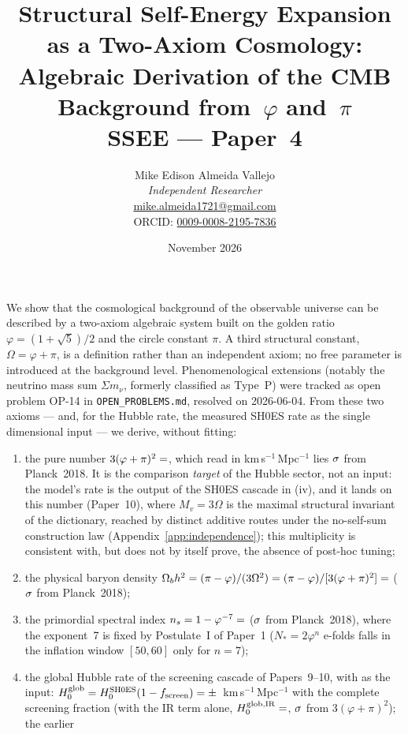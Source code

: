 \documentclass[12pt,a4paper]{article}
\title{\textbf{Structural Self-Energy Expansion as a Two-Axiom Cosmology:\\
Algebraic Derivation of the CMB Background from~$\varphi$ and~$\pi$}\\[0.5em]
\normalsize SSEE — Paper~4}
\author{Mike Edison Almeida Vallejo \\
\small \textit{Independent Researcher} \\
\small \href{mailto:mike.almeida1721@gmail.com}{mike.almeida1721@gmail.com} \\
\small ORCID: \href{https://orcid.org/0009-0008-2195-7836}{0009-0008-2195-7836}
}
\date{November 2026}
\renewenvironment{abstract}
  {\begin{center}\textbf{\abstractname}\end{center}\par\small\noindent\ignorespaces}
  {\par\medskip}
\begin{document}
\maketitle

\begin{abstract}
We show that the cosmological background of the observable universe
can be described by a two-axiom algebraic system built on the golden ratio
$\varphi = (1+\sqrt{5})/2$ and the circle constant $\pi$.
A third structural constant, $\Omega = \varphi+\pi$, is a definition
rather than an independent axiom; no free parameter is introduced at the background level.
Phenomenological extensions (notably the neutrino mass sum $\Sigma m_\nu$, formerly classified as Type~P) were tracked as open problem OP-14 in \texttt{OPEN\_PROBLEMS.md}, resolved on 2026-06-04.
From these two axioms --- and, for the Hubble rate, the measured SH0ES rate as the single
dimensional input --- we derive, without fitting:
\begin{enumerate}
\item[(i)] the pure number $3(\varphi+\pi)^2 = \val{H0_ALG_d6}$, which read in km\,s$^{-1}$\,Mpc$^{-1}$ lies $\val{halg_planck_sig}\sigma$ from Planck~2018. It is the comparison \emph{target} of the Hubble sector, not an input: the model's rate is the output of the SH0ES cascade in (iv), and it lands on this number (Paper~10),
where $M_v=3\Omega$ is the maximal structural invariant of the dictionary, reached by  distinct additive routes under the no-self-sum construction law (Appendix~\ref{app:independence}); this multiplicity is consistent with, but does not by itself prove, the absence of post-hoc tuning;
\item[(ii)] the physical baryon density
$\Omega_b h^2 = (\pi-\varphi)/(3\Omega^2) = (\pi-\varphi)/[3(\varphi+\pi)^2] = \val{OMEGA_B_H2_d6}$ ($\val{wb_planck_sig}\sigma$ from Planck~2018);
\item[(iii)] the primordial spectral index
$n_s = 1-\varphi^{-7} = \val{N_S_d6}$ ($\val{ns_planck_sig}\sigma$ from Planck~2018),
where the exponent~7 is fixed by Postulate~I of Paper~1 ($N_*=2\varphi^n$ e-folds falls in the
inflation window $[50,60]$ only for $n=7$);
\item[(iv)] the global Hubble rate of the screening cascade of Papers~9--10, with
\citet{Riess2022} as the input: $H_0^{\rm glob}=H_0^{\rm SH0ES}(1-f_{\rm screen})=\val{H0_GLOBAL_d6}\pm\val{p9_hglob_sigma}$~km\,s$^{-1}$\,Mpc$^{-1}$
with the complete screening fraction (with the IR term alone,
$H_0^{\rm glob,IR}=\val{p9_sh0es_glob_IR}$, $\val{p9_sh0es_sig_IR}\sigma$ from $3(\varphi+\pi)^2$); the earlier

\end{enumerate}
\end{abstract}
\end{document}
